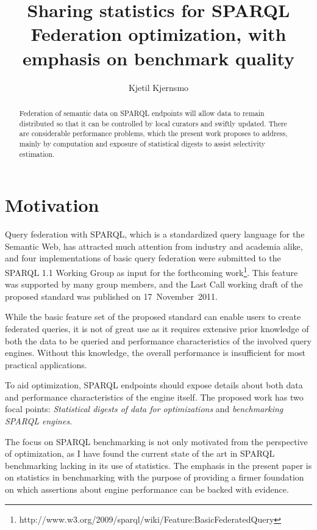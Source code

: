 \documentclass{llncs}
\title{Sharing statistics for SPARQL Federation optimization, with
  emphasis on benchmark quality}
\author{Kjetil Kjernsmo\inst{1}}
\institute{Department of Informatics,
Postboks 1080 Blindern,
0316 Oslo, Norway
\email{kjekje@ifi.uio.no}}
\begin{document}
\maketitle



\begin{abstract}
  Federation of semantic data on SPARQL endpoints will allow data to
  remain distributed so that it can be controlled by local curators
  and swiftly updated. There are considerable performance problems,
  which the present work proposes to address, mainly by computation
  and exposure of statistical digests to assist selectivity
  estimation.

\end{abstract}

\section{Motivation}

Query federation with SPARQL, which is a standardized query language
for the Semantic Web, has attracted much attention
from industry and academia alike, and four implementations of basic
query federation were submitted to the SPARQL 1.1 Working Group as
input for the forthcoming
work\footnote{http://www.w3.org/2009/sparql/wiki/Feature:BasicFederatedQuery}. 
This feature was
supported by many group members, and the Last Call working
draft of the proposed standard was published on 17~November~2011.

While the basic feature set of the proposed standard can enable users
to create federated queries, it is not of great use as it requires
extensive prior knowledge of both the data to be queried and
performance characteristics of the involved query engines. Without
this knowledge, the overall performance is insufficient for most
practical applications.

To aid optimization, SPARQL endpoints should expose details about both
data and performance characteristics of the engine itself. The
proposed work has two focal points: \emph{Statistical digests of
  data for optimizations} and \emph{benchmarking SPARQL engines}. 

The focus on SPARQL benchmarking is not only motivated from the
perspective of optimization, as I have found the current state of the art
in SPARQL benchmarking lacking in its use of statistics. The emphasis
in the present paper is on statistics in benchmarking with the purpose
of providing a firmer foundation on which assertions about engine
performance can be backed with evidence. 
\end{document}
